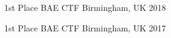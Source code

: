 



\begin{cvhonors}

  \cvhonor
    {1st Place} %
    {BAE CTF} %
    {Birmingham, UK} %
    {2018} %

  \cvhonor
    {1st Place} %
    {BAE CTF} %
    {Birmingham, UK} %
    {2017} %

\end{cvhonors}
